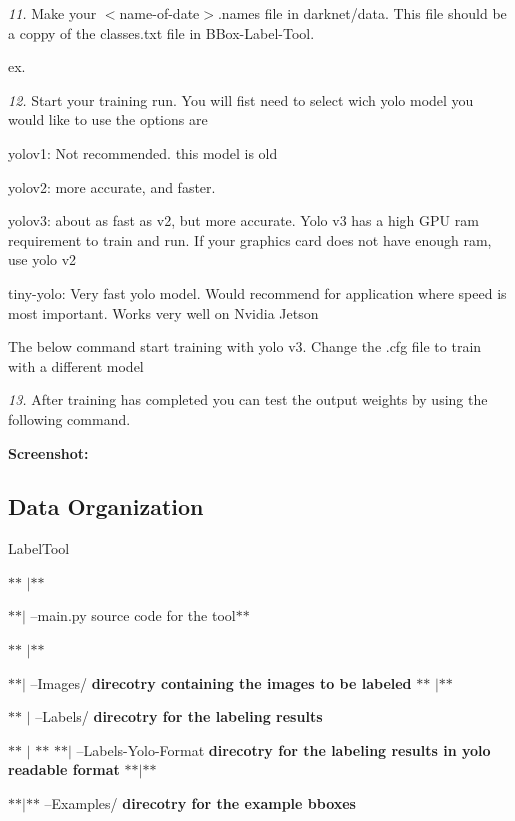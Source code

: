 {\itshape 11.} Make your $<$name-\/of-\/date$>$.names file in {\ttfamily darknet/data}. This file should be a coppy of the classes.\+txt file in {\ttfamily B\+Box-\/\+Label-\/\+Tool}.

ex. 
\begin{DoxyCode}{0}
\end{DoxyCode}


{\itshape 12.} Start your training run. You will fist need to select wich yolo model you would like to use the options are


\begin{DoxyItemize}
\item yolov1\+: Not recommended. this model is old
\item yolov2\+: more accurate, and faster.
\item yolov3\+: about as fast as v2, but more accurate. Yolo v3 has a high G\+PU ram requirement to train and run. If your graphics card does not have enough ram, use yolo v2
\item tiny-\/yolo\+: Very fast yolo model. Would recommend for application where speed is most important. Works very well on Nvidia Jetson
\end{DoxyItemize}

The below command start training with yolo v3. Change the .cfg file to train with a different model 
\begin{DoxyCode}{0}
\end{DoxyCode}


{\itshape 13.} After training has completed you can test the output weights by using the following command. 
\begin{DoxyCode}{0}
\end{DoxyCode}


{\bfseries{Screenshot\+:}} 

\subsection*{Data Organization }

Label\+Tool

$\ast$$\ast$ $\vert$$\ast$$\ast$

$\ast$$\ast$$\vert$ --main.\+py source code for the tool$\ast$$\ast$

$\ast$$\ast$ $\vert$$\ast$$\ast$

$\ast$$\ast$$\vert$ --Images/ {\bfseries{direcotry containing the images to be labeled}} $\ast$$\ast$ $\vert$$\ast$$\ast$

$\ast$$\ast$ $\vert$ --Labels/ {\bfseries{direcotry for the labeling results}}

$\ast$$\ast$ $\vert$ $\ast$$\ast$ $\ast$$\ast$$\vert$ --Labels-\/\+Yolo-\/\+Format {\bfseries{direcotry for the labeling results in yolo readable format}} $\ast$$\ast$$\vert$$\ast$$\ast$

$\ast$$\ast$$\vert$$\ast$$\ast$ --Examples/ {\bfseries{direcotry for the example bboxes}} 